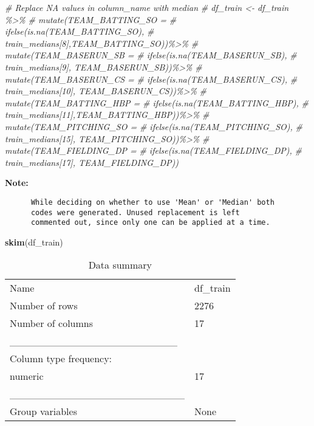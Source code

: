 \documentclass[
]{article}
\newenvironment{Shaded}{\begin{snugshade}}{\end{snugshade}}
\newcommand{\CommentTok}[1]{\textcolor[rgb]{0.56,0.35,0.01}{\textit{#1}}}
\newcommand{\FunctionTok}[1]{\textcolor[rgb]{0.13,0.29,0.53}{\textbf{#1}}}
\newcommand{\NormalTok}[1]{#1}
\begin{document}
\begin{Shaded}
\begin{Highlighting}[]
\CommentTok{\# Replace NA values in \textquotesingle{}column\_name\textquotesingle{} with \textquotesingle{}median\textquotesingle{}}
\CommentTok{\# df\_train \textless{}{-} df\_train \%\textgreater{}\%}
\CommentTok{\#   mutate(TEAM\_BATTING\_SO =}
\CommentTok{\#            ifelse(is.na(TEAM\_BATTING\_SO),}
\CommentTok{\#                   train\_medians[8],TEAM\_BATTING\_SO))\%\textgreater{}\% }
\CommentTok{\#   mutate(TEAM\_BASERUN\_SB = }
\CommentTok{\#            ifelse(is.na(TEAM\_BASERUN\_SB),}
\CommentTok{\#                   train\_medians[9], TEAM\_BASERUN\_SB))\%\textgreater{}\%}
\CommentTok{\#   mutate(TEAM\_BASERUN\_CS =}
\CommentTok{\#            ifelse(is.na(TEAM\_BASERUN\_CS),}
\CommentTok{\#                   train\_medians[10], TEAM\_BASERUN\_CS))\%\textgreater{}\%}
\CommentTok{\#   mutate(TEAM\_BATTING\_HBP = }
\CommentTok{\#            ifelse(is.na(TEAM\_BATTING\_HBP),}
\CommentTok{\#                   train\_medians[11],TEAM\_BATTING\_HBP))\%\textgreater{}\%}
\CommentTok{\#   mutate(TEAM\_PITCHING\_SO =}
\CommentTok{\#            ifelse(is.na(TEAM\_PITCHING\_SO),}
\CommentTok{\#                   train\_medians[15], TEAM\_PITCHING\_SO))\%\textgreater{}\%}
\CommentTok{\#   mutate(TEAM\_FIELDING\_DP =}
\CommentTok{\#            ifelse(is.na(TEAM\_FIELDING\_DP),}
\CommentTok{\#                   train\_medians[17], TEAM\_FIELDING\_DP))}
\end{Highlighting}
\end{Shaded}

\textbf{Note:}

\begin{verbatim}
      While deciding on whether to use 'Mean' or 'Median' both 
      codes were generated. Unused replacement is left 
      commented out, since only one can be applied at a time.
\end{verbatim}

\begin{Shaded}
\begin{Highlighting}[]
\FunctionTok{skim}\NormalTok{(df\_train)}
\end{Highlighting}
\end{Shaded}

\begin{longtable}[]{@{}ll@{}}
\caption{Data summary}\tabularnewline
\toprule\noalign{}
\endfirsthead
\endhead
\bottomrule\noalign{}
\endlastfoot
Name & df\_train \\
Number of rows & 2276 \\
Number of columns & 17 \\
\_\_\_\_\_\_\_\_\_\_\_\_\_\_\_\_\_\_\_\_\_\_\_ & \\
Column type frequency: & \\
numeric & 17 \\
\_\_\_\_\_\_\_\_\_\_\_\_\_\_\_\_\_\_\_\_\_\_\_\_ & \\
Group variables & None \\
\end{longtable}
\end{document}
